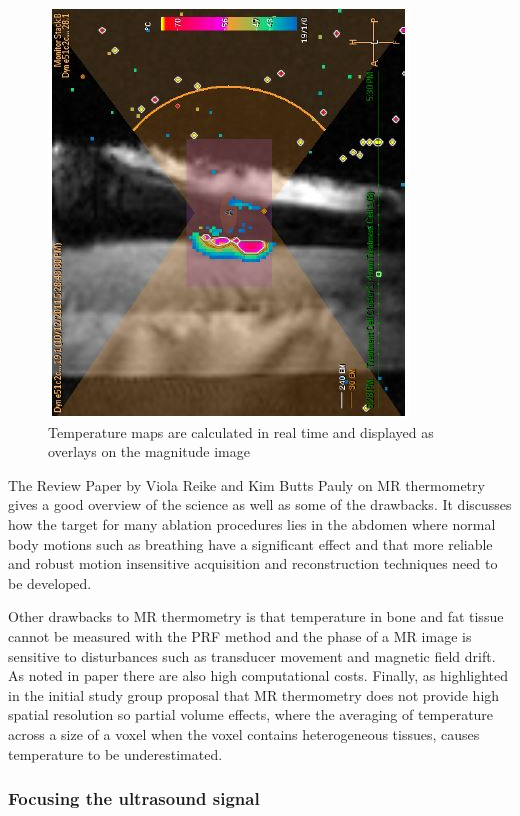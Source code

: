 \documentclass[11pt]{article} %
\begin{document}
	\begin{figure}
		\centering
		\includegraphics[width=0.7\linewidth]{Report_images/MRIimage}
		\caption{Temperature maps are calculated in real time and displayed as overlays on the magnitude image}
		\label{fig:mriimage}
	\end{figure}
	
	The Review Paper by Viola Reike and Kim Butts Pauly on MR thermometry \cite{Rieke2008} gives a good overview of the science as well as some of the drawbacks.  	It discusses how the target for many ablation procedures lies in the abdomen where normal body motions such as breathing have a significant effect and that more reliable and robust motion insensitive acquisition and reconstruction techniques need to be developed.
	 
	Other drawbacks to MR thermometry is that temperature in bone and fat tissue cannot be measured with the PRF method and the phase of a MR image is sensitive to disturbances such as transducer movement and magnetic field drift. As noted in paper \cite{Hosseini2018} there are also high computational costs. Finally, as highlighted in the initial study group proposal that MR thermometry does not provide high spatial resolution so partial volume effects, where the averaging of temperature across a size of a voxel when the voxel contains heterogeneous tissues, causes temperature to be underestimated.
	
	

	
	\subsubsection{Focusing the ultrasound signal}
	
\end{document}
